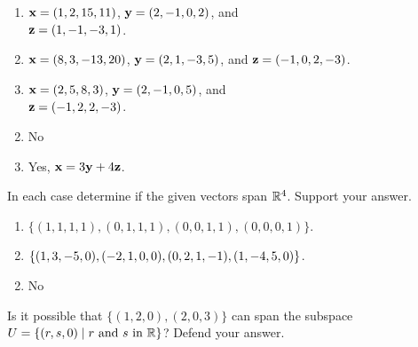 \begin{multicols}{2}
\begin{ex}
\begin{enumerate}[label={\alph*.}]
\item $\textbf{x} = (1, 2, 15, 11)$, $\textbf{y} = (2, -1, 0, 2)$, and \\$\textbf{z} = (1, -1, -3, 1)$.

\item $\textbf{x} = (8, 3, -13, 20)$, $\textbf{y} = (2, 1, -3, 5)$, and $\textbf{z} = (-1, 0, 2, -3)$.

\item $\textbf{x} = (2, 5, 8, 3)$, $\textbf{y} = (2, -1, 0, 5)$, and \\$\textbf{z} = (-1, 2, 2, -3)$.

\end{enumerate}
\begin{sol}
\begin{enumerate}[label={\alph*.}]
\setcounter{enumi}{1}
\item  No

\setcounter{enumi}{3}
\item  Yes, $\textbf{x} = 3\textbf{y} + 4\textbf{z}$.

\end{enumerate}
\end{sol}
\end{ex}

\begin{ex}
In each case determine if the given vectors span $\mathbb{R}^4$. Support your answer.

\begin{enumerate}[label={\alph*.}]
\item $\{(1, 1, 1, 1), (0, 1, 1, 1), (0, 0, 1, 1), (0, 0, 0, 1)\}$.

\item $\{(1, 3, -5, 0), (-2, 1, 0, 0), (0, 2, 1, -1),\\ (1, -4, 5, 0)\}$.

\end{enumerate}
\begin{sol}
\begin{enumerate}[label={\alph*.}]
\setcounter{enumi}{1}
\item  No

\end{enumerate}
\end{sol}
\end{ex}

\begin{ex}
Is it possible that $\{(1, 2, 0), (2, 0, 3)\}$ can span the subspace $U = \{(r, s, 0) \mid r \mbox{ and } s \mbox{ in } \mathbb{R}\}$? Defend your answer.
\end{ex}


\end{multicols}
